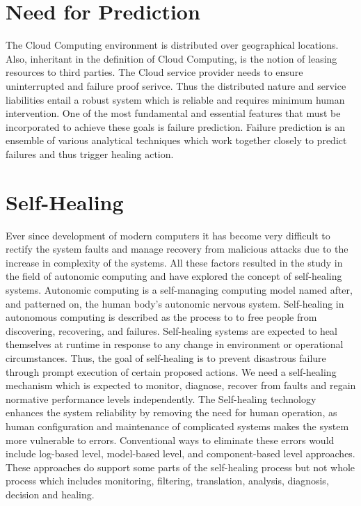 \section{Need for Prediction}
The Cloud Computing environment is distributed over geographical locations. Also, inheritant in the definition of Cloud Computing, is the notion of leasing resources to third parties. The Cloud service provider needs to ensure uninterrupted and failure proof serivce. Thus the distributed nature and service liabilities entail a robust system which is reliable and requires minimum human intervention. One of the most fundamental and essential features that must be incorporated to achieve these goals is failure prediction. Failure prediction is an ensemble of various analytical techniques which work together closely to predict failures and thus trigger healing action.
\section{Self-Healing}
Ever since development of modern computers it has become very difficult to rectify the system faults and manage recovery from malicious attacks due to the increase in complexity of the systems. All these factors resulted in the study in the field of autonomic computing and have explored the concept of self-healing systems. Autonomic computing is a self-managing computing model named after, and patterned on, the human body's autonomic nervous system. Self-healing in autonomous computing is described as the process to to free people from discovering, recovering, and failures.  Self-healing systems are expected to heal themselves at runtime in response to any change in environment or operational circumstances. Thus, the goal of self-healing is to prevent disastrous failure through prompt execution of certain proposed actions. We need a self-healing mechanism which is expected to monitor, diagnose, recover from faults and regain normative performance levels independently. The Self-healing technology enhances the system reliability by removing the need for human operation, as human configuration and maintenance of complicated systems makes the system more vulnerable to errors.  Conventional ways to eliminate these errors would include log-based level, model-based level, and component-based level approaches. These approaches do support some parts of the self-healing process but not whole process which includes monitoring, filtering, translation, analysis, diagnosis, decision and healing.
